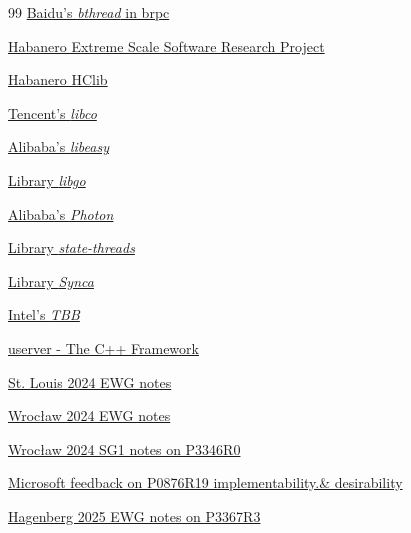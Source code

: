 \begin{thebibliography}{99}
        \href{https://brpc.apache.org/docs/bthread/}
        {Baidu's \emph{bthread} in brpc}

        \href{https://wiki.rice.edu/confluence/display/HABANERO/Habanero+Extreme+Scale+Software+Research+Project}
        {Habanero Extreme Scale Software Research Project}

        \href{https://github.com/habanero-rice/hclib}
        {Habanero HClib}

        \href{https://github.com/Tencent/libco}
        {Tencent's \emph{libco}}

        \href{https://github.com/oceanbase/oceanbase/tree/develop/deps/easy}
        {Alibaba's \emph{libeasy}}

        \href{https://github.com/yyzybb537/libgo}
        {Library \emph{libgo}}

        \href{https://github.com/alibaba/PhotonLibOS}
        {Alibaba's \emph{Photon}}

        \href{https://github.com/ossrs/state-threads}
        {Library \emph{state-threads}}

        \href{https://github.com/gridem/Synca}
        {Library \emph{Synca}}

        \href{https://github.com/intel/tbb}
        {Intel's \emph{TBB}}

        \href{https://github.com/userver-framework}
        {userver - The C++ Framework}

        \href{https://wiki.edg.com/bin/view/Wg21stlouis2024/NotesEWGP0876}
        {St. Louis 2024 EWG notes}

        \href{https://wiki.edg.com/bin/view/Wg21wroclaw2024/NotesEWGP0876}
        {Wrocław 2024 EWG notes}

        \href{https://wiki.edg.com/bin/edit/Wg21wroclaw2024/P3346R0?topicparent=Wg21wroclaw2024.SG1}
        {Wrocław 2024 SG1 notes on P3346R0}

        \href{https://lists.isocpp.org/ext/2025/02/25138.php}
        {Microsoft feedback on P0876R19 implementability.\& desirability}

        \href{https://wiki.edg.com/bin/edit/Wg21hagenberg2025/NotesEWGP3367}
        {Hagenberg 2025 EWG notes on P3367R3}

\end{thebibliography}
